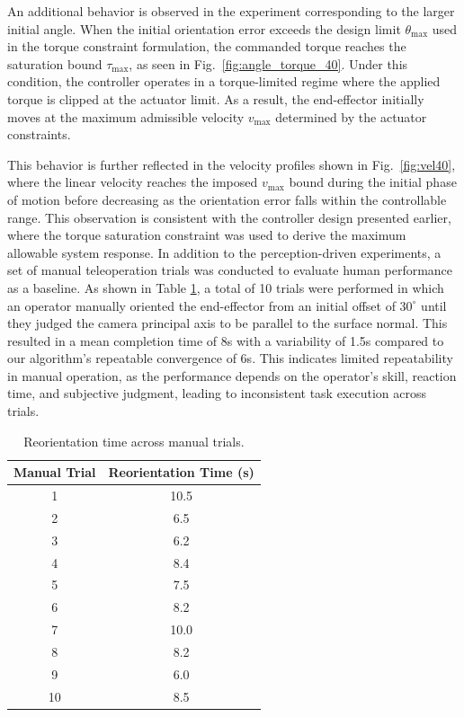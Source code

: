 \documentclass[journal]{IEEEtran}
\begin{document}
An additional behavior is observed in the experiment corresponding to the larger initial angle. When the initial orientation error exceeds the design limit $\theta_{\max}$ used in the torque constraint formulation, the commanded torque reaches the saturation bound $\tau_{\max}$, as seen in Fig.~\ref{fig:angle_torque_40}. Under this condition, the controller operates in a torque-limited regime where the applied torque is clipped at the actuator limit. As a result, the end-effector initially moves at the maximum admissible velocity $v_{\max}$ determined by the actuator constraints.

This behavior is further reflected in the velocity profiles shown in Fig.~\ref{fig:vel40}, where the linear velocity reaches the imposed $v_{\max}$ bound during the initial phase of motion before decreasing as the orientation error falls within the controllable range. This observation is consistent with the controller design presented earlier, where the torque saturation constraint was used to derive the maximum allowable system response.
In addition to the perception-driven experiments, a set of manual teleoperation trials was conducted to evaluate human performance as a baseline. As shown in Table \ref{tab:manual_reorientation}, a total of 10 trials were performed in which an operator manually oriented the end-effector from an initial offset of $30^\circ$ until they judged the camera principal axis to be parallel to the surface normal. This resulted in a mean completion time of 8s with a variability of 1.5s compared to our algorithm's repeatable convergence of 6s. This indicates limited repeatability in manual operation, as the performance depends on the operator's skill, reaction time, and subjective judgment, leading to inconsistent task execution across trials.

\begin{table}[t]
\centering
\caption{Reorientation time across manual trials.}
\label{tab:manual_reorientation}
\begin{tabular}{cc}
\toprule
Manual Trial & Reorientation Time (s) \\
\midrule
1  & 10.5 \\
2  & 6.5  \\
3  & 6.2  \\
4  & 8.4  \\
5  & 7.5  \\
6  & 8.2  \\
7  & 10.0 \\
8  & 8.2  \\
9  & 6.0  \\
10 & 8.5  \\
\bottomrule
\end{tabular}
\end{table}
\end{document}
